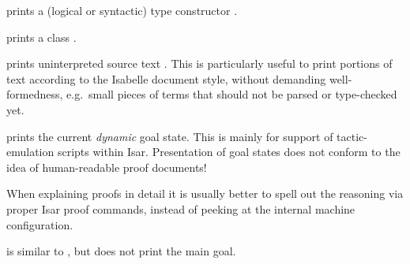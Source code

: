 \begin{isabellebody}
\begin{isamarkuptext}
\begin{description}
  \item {} prints a (logical or syntactic) type
    constructor .

  \item {} prints a class .

  \item {} prints uninterpreted source text .  This is particularly useful to print portions of text according
  to the Isabelle document style, without demanding well-formedness,
  e.g.\ small pieces of terms that should not be parsed or
  type-checked yet.

  \item {} prints the current \emph{dynamic} goal
  state.  This is mainly for support of tactic-emulation scripts
  within Isar.  Presentation of goal states does not conform to the
  idea of human-readable proof documents!

  When explaining proofs in detail it is usually better to spell out
  the reasoning via proper Isar proof commands, instead of peeking at
  the internal machine configuration.
  
  \item {} is similar to , but
  does not print the main goal.
  

\end{description}
\end{isamarkuptext}
\end{isabellebody}
